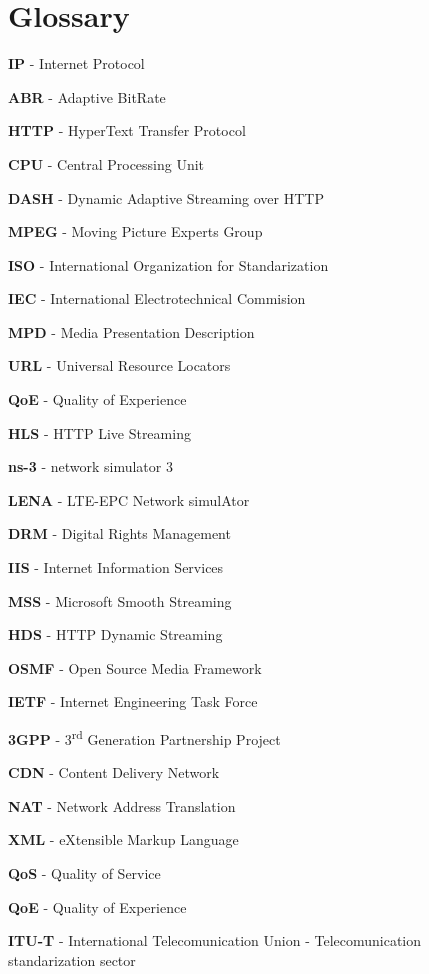 \cleardoublepage
{}
\chapter*{Glossary}


\textbf{IP} - Internet Protocol

\textbf{ABR} - Adaptive BitRate

\textbf{HTTP} - HyperText Transfer Protocol

\textbf{CPU} - Central Processing Unit

\textbf{DASH} - Dynamic Adaptive Streaming over HTTP

\textbf{MPEG} - Moving Picture Experts Group

\textbf{ISO} - International Organization for Standarization

\textbf{IEC} - International Electrotechnical Commision

\textbf{MPD} - Media Presentation Description

\textbf{URL} - Universal Resource Locators

\textbf{QoE} - Quality of Experience

\textbf{HLS} - HTTP Live Streaming

\textbf{ns-3} - network simulator 3

\textbf{LENA} - LTE-EPC Network simulAtor

\textbf{DRM} - Digital Rights Management

\textbf{IIS} - Internet Information Services

\textbf{MSS} - Microsoft Smooth Streaming

\textbf{HDS} - HTTP Dynamic Streaming

\textbf{OSMF} - Open Source Media Framework

\textbf{IETF} - Internet Engineering Task Force

\textbf{3GPP} - 3\textsuperscript{rd} Generation Partnership Project

\textbf{CDN} - Content Delivery Network

\textbf{NAT} - Network Address Translation

\textbf{XML} - eXtensible Markup Language

\textbf{QoS} - Quality of Service

\textbf{QoE} - Quality of Experience

\textbf{ITU-T} - International Telecomunication Union - Telecomunication standarization sector

\cleardoublepage
